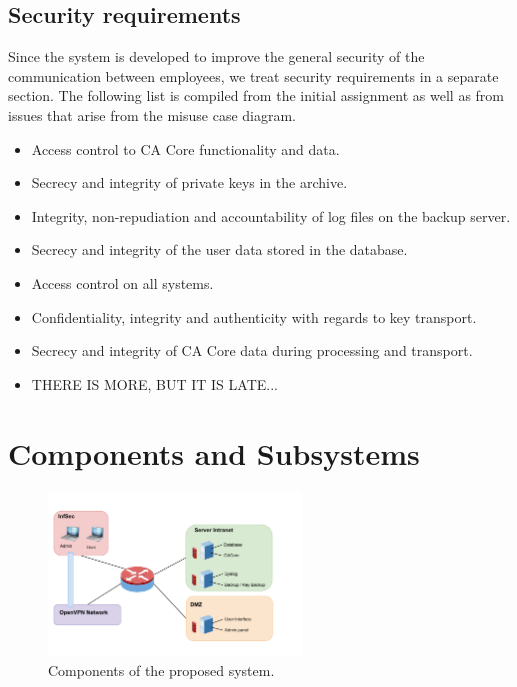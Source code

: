 \documentclass[a4paper, toc=index, 12pt, DIV14, twoside, BCOR2cm, headsepline, numbers=noenddot, bibliography=totoc]{scrbook}
\begin{document}
\subsection{Security requirements}
Since the system is developed to improve the general security of the communication between employees, we treat security requirements in a separate section. The following list is compiled from the initial assignment as well as from issues that arise from the misuse case diagram.
\begin{itemize}
\item Access control to CA Core functionality and data.
\item Secrecy and integrity of private keys in the archive.
\item Integrity, non-repudiation and accountability of log files on the backup server.
\item Secrecy and integrity of the user data stored in the database.
\item Access control on all systems.
\item Confidentiality, integrity and authenticity with regards to key transport.
\item Secrecy and integrity of CA Core data during processing and transport.
\item THERE IS MORE, BUT IT IS LATE...
\end{itemize}

\section{Components and Subsystems}
\begin{figure}[H]
  \centering
    \includegraphics[width=0.6\textwidth]{images/system_components.pdf}  
  \caption{Components of the proposed system.}
  \label{systemcomponents}
\end{figure}
\end{document}
